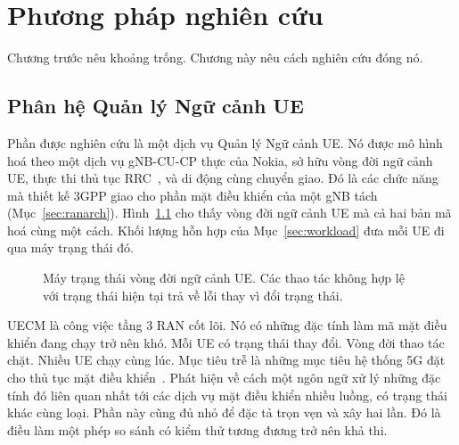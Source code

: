 \chapter{Phương pháp nghiên cứu\label{chapter:methodology}}

Chương trước nêu khoảng trống. Chương này nêu cách nghiên cứu đóng nó.

\section{Phân hệ Quản lý Ngữ cảnh UE}\label{sec:uecm}
Phần được nghiên cứu là một dịch vụ Quản lý Ngữ cảnh UE. Nó được mô hình hoá theo một dịch vụ
gNB-CU-CP thực của Nokia, sở hữu vòng đời ngữ cảnh UE, thực thi thủ tục
RRC~\cite{3gpp38331}, và di động cùng chuyển giao. Đó là các chức năng mà thiết kế 3GPP giao
cho phần mặt điều khiển của một gNB tách (Mục~\ref{sec:ranarch}). Hình~\ref{fig:fsm} cho thấy
vòng đời ngữ cảnh UE mà cả hai bản mã hoá cùng một cách. Khối lượng hỗn hợp của
Mục~\ref{sec:workload} đưa mỗi UE đi qua máy trạng thái đó.

\begin{figure}[ht]
\centering
{}
\caption[Máy trạng thái vòng đời ngữ cảnh UE]{Máy trạng thái vòng đời ngữ cảnh UE.
Các thao tác không hợp lệ với trạng thái hiện tại trả về lỗi thay vì đổi
trạng thái.\label{fig:fsm}}
\end{figure}

UECM là công việc tầng 3 RAN cốt lõi. Nó có những đặc tính làm mã mặt điều khiển đang chạy trở
nên khó. Mỗi UE có trạng thái thay đổi. Vòng đời thao tác chặt. Nhiều UE chạy cùng lúc. Mục
tiêu trễ là những mục tiêu hệ thống 5G đặt cho thủ tục mặt điều
khiển~\cite{3gpp38913,3gpp22261}. Phát hiện về cách một ngôn ngữ xử lý những đặc tính đó liên
quan nhất tới các dịch vụ mặt điều khiển nhiều luồng, có trạng thái khác cùng loại. Phần này
cũng đủ nhỏ để đặc tả trọn vẹn và xây hai lần. Đó là điều làm một phép so sánh có kiểm thử
tương đương trở nên khả thi.

